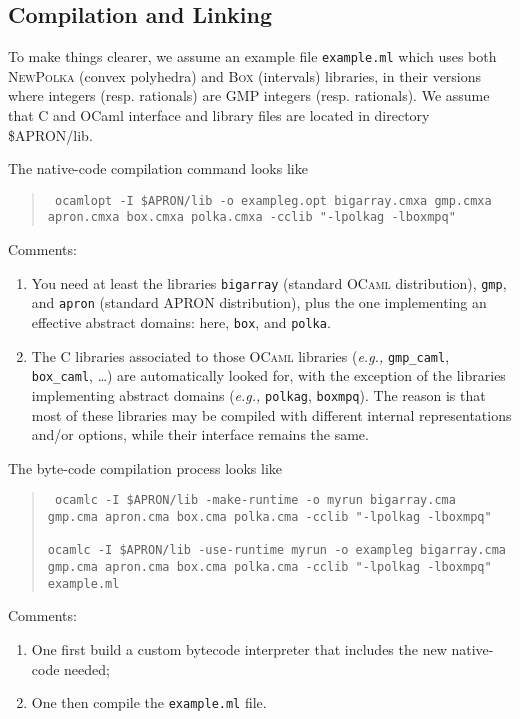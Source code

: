 \documentclass[twoside,10pt,a4paper]{report}
\begin{document}
\subsection*{Compilation and Linking}

To make things clearer, we assume an example file
\texttt{example.ml} which uses both \textsc{NewPolka} (convex
polyhedra) and \textsc{Box} (intervals) libraries, in their
versions where integers (resp. rationals) are GMP integers (resp.
rationals). We assume that C and OCaml interface and library files
are located in directory \$APRON/lib.

The native-code compilation command looks like
\begin{quote}\tt
  ocamlopt -I \$APRON/lib -o exampleg.opt bigarray.cmxa gmp.cmxa apron.cmxa box.cmxa polka.cmxa -cclib "-lpolkag -lboxmpq"
\end{quote}
Comments:
\begin{enumerate}
\item You need at least the libraries \texttt{bigarray} (standard
  \textsc{OCaml} distribution), \texttt{gmp}, and \texttt{apron}
  (standard APRON distribution), plus the one implementing an
  effective abstract domains: here, \texttt{box}, and
  \texttt{polka}.
\item The C libraries associated to those \textsc{OCaml} libraries
  (\textit{e.g.,} \texttt{gmp\_caml}, \texttt{box\_caml}, \ldots)
  are automatically looked for, with the exception of the
  libraries implementing abstract domains (\textit{e.g.,}
  \texttt{polkag}, \texttt{boxmpq}). The reason is that most of
  these libraries may be compiled with different internal
  representations and/or options, while their interface remains
  the same.
\end{enumerate}

The byte-code compilation process looks like
\begin{quote}\tt
  ocamlc -I \$APRON/lib -make-runtime -o myrun bigarray.cma gmp.cma apron.cma box.cma polka.cma -cclib "-lpolkag -lboxmpq" \\
  ~\\
  ocamlc -I \$APRON/lib -use-runtime myrun -o exampleg bigarray.cma gmp.cma apron.cma box.cma polka.cma -cclib "-lpolkag -lboxmpq" example.ml
\end{quote}
Comments:
\begin{enumerate}
\item One first build a custom bytecode interpreter that includes the new native-code needed;
\item One then compile the \texttt{example.ml} file.
\end{enumerate}
\end{document}
